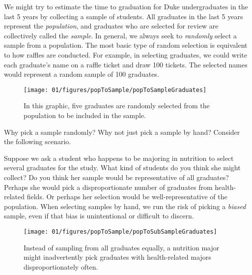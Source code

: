 
We might try to estimate the time to graduation for Duke undergraduates in the last 5 years by collecting a sample of students. All graduates in the last 5 years represent the \emph{population}, and graduates who are selected for review are collectively called the \emph{sample}. In general, we always seek to \emph{randomly} select a sample from a population. The most basic type of random selection is equivalent to how raffles are conducted. For example, in selecting graduates, we could write each graduate's name on a raffle ticket and draw 100 tickets. The selected names would represent a random sample of 100 graduates.

\begin{figure}[ht]
\centering
\texttt{[image: 01/figures/popToSample/popToSampleGraduates]}
\caption{In this graphic, five graduates are randomly selected from the population to be included in the sample.}
\label{popToSampleGraduates}
\end{figure}

Why pick a sample randomly? Why not just pick a sample by hand? Consider the following scenario.

\begin{example}{Suppose we ask a student who happens to be majoring in nutrition to select several graduates for the study. What kind of students do you think she might collect? Do you think her sample would be representative of all graduates?}
Perhaps she would pick a disproportionate number of graduates from health-related fields. Or perhaps her selection would be well-representative of the population. When selecting samples by hand, we run the risk of picking a \emph{biased} sample, even if that bias is unintentional or difficult to discern.
\end{example}

\begin{figure}
\centering
\texttt{[image: 01/figures/popToSample/popToSubSampleGraduates]}
\caption{Instead of sampling from all graduates equally, a nutrition major might inadvertently pick graduates with health-related majors disproportionately often.}
\label{popToSubSampleGraduates}
\end{figure}

